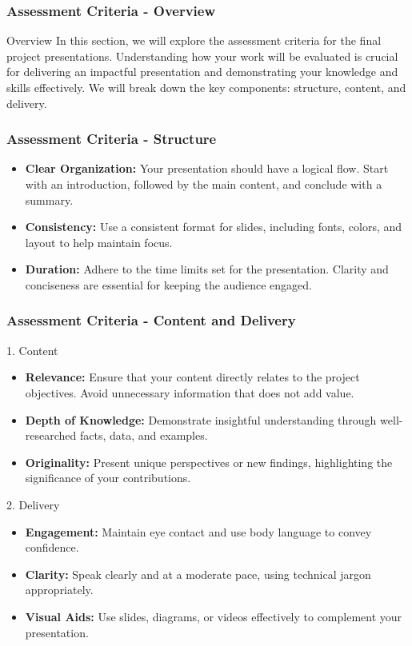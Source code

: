 \documentclass[aspectratio=169]{beamer}
\begin{document}
\begin{frame}[fragile]
  \frametitle{Assessment Criteria - Overview}
  \begin{block}{Overview}
    In this section, we will explore the assessment criteria for the final project presentations. 
    Understanding how your work will be evaluated is crucial for delivering an impactful presentation 
    and demonstrating your knowledge and skills effectively. 
    We will break down the key components: structure, content, and delivery.
  \end{block}
\end{frame}

\begin{frame}[fragile]
  \frametitle{Assessment Criteria - Structure}
  \begin{itemize}
    \item \textbf{Clear Organization:} 
    Your presentation should have a logical flow. Start with an introduction, followed by the main content, and conclude with a summary.
    \item \textbf{Consistency:}
    Use a consistent format for slides, including fonts, colors, and layout to help maintain focus.
    \item \textbf{Duration:}
    Adhere to the time limits set for the presentation. Clarity and conciseness are essential for keeping the audience engaged.
  \end{itemize}
\end{frame}

\begin{frame}[fragile]
  \frametitle{Assessment Criteria - Content and Delivery}
  \begin{block}{1. Content}
    \begin{itemize}
      \item \textbf{Relevance:} Ensure that your content directly relates to the project objectives. 
      Avoid unnecessary information that does not add value.
      \item \textbf{Depth of Knowledge:} Demonstrate insightful understanding through well-researched facts, data, and examples.
      \item \textbf{Originality:} Present unique perspectives or new findings, highlighting the significance of your contributions.
    \end{itemize}
  \end{block}

  \begin{block}{2. Delivery}
    \begin{itemize}
      \item \textbf{Engagement:} Maintain eye contact and use body language to convey confidence.
      \item \textbf{Clarity:} Speak clearly and at a moderate pace, using technical jargon appropriately.
      \item \textbf{Visual Aids:} Use slides, diagrams, or videos effectively to complement your presentation.
    \end{itemize}
  \end{block}
\end{frame}
\end{document}
